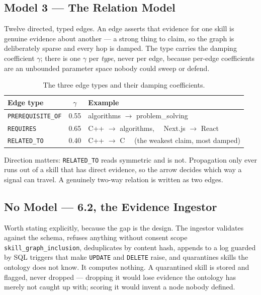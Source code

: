 \documentclass[11pt,a4paper]{article}
\begin{document}
\subsection*{Model 3 --- The Relation Model}

Twelve directed, typed edges. An edge asserts that evidence for one skill is
genuine evidence about another --- a strong thing to claim, so the graph is
deliberately sparse and every hop is damped. The type carries the damping
coefficient $\gamma$; there is one $\gamma$ per \emph{type}, never per edge,
because per-edge coefficients are an unbounded parameter space nobody could
sweep or defend.

\begin{table}[H]
\centering\small
\begin{tabular}{@{}lcL{7.2cm}@{}}
\toprule
\textbf{Edge type} & $\gamma$ & \textbf{Example} \\
\midrule
\texttt{PREREQUISITE\_OF} & 0.55 & algorithms $\to$ problem\_solving \\
\texttt{REQUIRES}         & 0.65 & C++ $\to$ algorithms, \ \ Next.js $\to$ React \\
\texttt{RELATED\_TO}      & 0.40 & C++ $\to$ C \ \ (the weakest claim, most damped) \\
\bottomrule
\end{tabular}
\caption{The three edge types and their damping coefficients.}
\end{table}

Direction matters: \texttt{RELATED\_TO} reads symmetric and is not.
Propagation only ever runs out of a skill that has direct evidence, so the
arrow decides which way a signal can travel. A genuinely two-way relation is
written as two edges.

\subsection*{No Model --- 6.2, the Evidence Ingestor}

Worth stating explicitly, because the gap is the design. The ingestor
validates against the schema, refuses anything without consent scope
\texttt{skill\_graph\_inclusion}, deduplicates by content hash, appends to a
log guarded by SQL triggers that make \texttt{UPDATE} and \texttt{DELETE}
raise, and quarantines skills the ontology does not know. It computes
nothing. A quarantined skill is stored and flagged, never dropped ---
dropping it would lose evidence the ontology has merely not caught up with;
scoring it would invent a node nobody defined.
\end{document}
